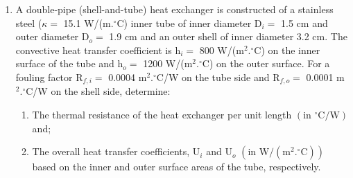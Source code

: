 \documentclass[calculator,datasheet,handbook,solutions]{exam}
\begin{document}
\begin{question}
\begin{enumerate}
   \item A double-pipe (shell-and-tube) heat exchanger is constructed of a stainless steel ($\kappa=$ 15.1 W/(m.$^{\circ}$C) inner tube of inner diameter D$_{i}=$ 1.5 cm and outer diameter D$_{o}=$ 1.9 cm and an outer shell of inner diameter 3.2 cm. The convective heat transfer coefficient is h$_{i}=$ 800 W/(m$^{2}.^{\circ}$C) on the inner surface of the tube and h$_{o}=$ 1200 W/(m$^{2}.^{\circ}$C) on the outer surface. For a fouling factor R$_{f,i}=$ 0.0004 m$^{2}.^{\circ}$C/W on the tube side and R$_{f,o}=$ 0.0001 m$^{2}.^{\circ}$C/W on the shell side, determine:%
\begin{enumerate}
   \item The thermal resistance of the heat exchanger per unit length $\left(\text{in }^{\circ}\text{C/W}\right)$ and; 
       
   \item The overall heat transfer coefficients, U$_{i}$ and U$_{o}$ $\left(\text{in W/}\left(\text{m}^{2}.^{\circ}\text{C}\right)\right)$ based on the inner and outer surface areas of the tube, respectively.
\end{enumerate}


  \end{enumerate}
  
\end{question}
\end{document}
